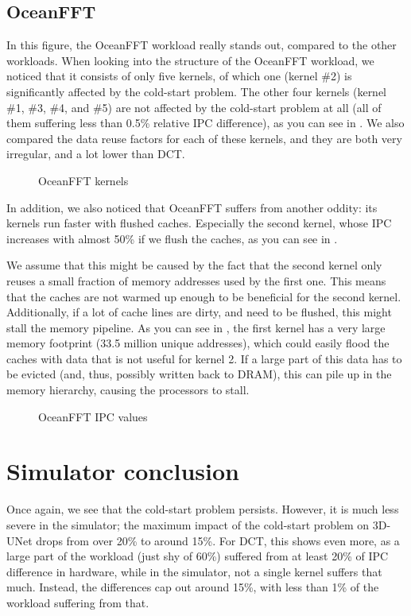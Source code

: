 \subsection{OceanFFT}\label{subsec:oceanfft}
In this figure, the OceanFFT workload really stands out, compared to the other workloads.
When looking into the structure of the OceanFFT workload, we noticed that it consists of only five kernels, of which one (kernel \#2) is significantly affected by the cold-start problem.
The other four kernels (kernel \#1, \#3, \#4, and \#5) are not affected by the cold-start problem at all (all of them suffering less than 0.5\% relative IPC difference), as you can see in .
We also compared the data reuse factors for each of these kernels, and they are both very irregular, and a lot lower than DCT\@.

\begin{figure}[ht]
    \centering
    \caption{OceanFFT kernels}
    \label{fig:ocean_kernels}
\end{figure}

In addition, we also noticed that OceanFFT suffers from another oddity: its kernels run faster with flushed caches.
Especially the second kernel, whose IPC increases with almost 50\% if we flush the caches, as you can see in .

We assume that this might be caused by the fact that the second kernel only reuses a small fraction of memory addresses used by the first one.
This means that the caches are not warmed up enough to be beneficial for the second kernel.
Additionally, if a lot of cache lines are dirty, and need to be flushed, this might stall the memory pipeline.
As you can see in , the first kernel has a very large memory footprint (33.5 million unique addresses), which could easily flood the caches with data that is not useful for kernel 2.
If a large part of this data has to be evicted (and, thus, possibly written back to DRAM), this can pile up in the memory hierarchy, causing the processors to stall.

\begin{figure}[ht]
    \centering
    \caption{OceanFFT IPC values}
    \label{fig:ocean_issue}
\end{figure}


\FloatBarrier
\section{Simulator conclusion}\label{sec:simulator-conclusion}
Once again, we see that the cold-start problem persists.
However, it is much less severe in the simulator; the maximum impact of the cold-start problem on 3D-UNet drops from over 20\% to around 15\%.
For DCT, this shows even more, as a large part of the workload (just shy of 60\%) suffered from at least 20\% of IPC difference in hardware, while in the simulator, not a single kernel suffers that much.
Instead, the differences cap out around 15\%, with less than 1\% of the workload suffering from that.

